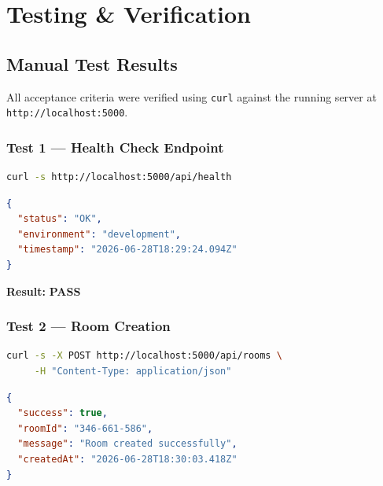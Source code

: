 \documentclass[11pt,a4paper]{article}
\begin{document}
\section{Testing \& Verification}

\subsection{Manual Test Results}

All acceptance criteria were verified using \texttt{curl} against the running server at \texttt{http://localhost:5000}.

\subsubsection{Test 1 --- Health Check Endpoint}

\begin{lstlisting}[language=bash, caption={Health Check curl Command}]
curl -s http://localhost:5000/api/health
\end{lstlisting}

\begin{lstlisting}[language=json, caption={Health Check --- Actual Output}]
{
  "status": "OK",
  "environment": "development",
  "timestamp": "2026-06-28T18:29:24.094Z"
}
\end{lstlisting}

\textbf{Result:} \textcolor{successgreen}{\textbf{PASS}} 

\vspace{0.8em}

\subsubsection{Test 2 --- Room Creation}

\begin{lstlisting}[language=bash, caption={Room Creation curl Command}]
curl -s -X POST http://localhost:5000/api/rooms \
     -H "Content-Type: application/json"
\end{lstlisting}

\begin{lstlisting}[language=json, caption={Room Creation --- Actual Output}]
{
  "success": true,
  "roomId": "346-661-586",
  "message": "Room created successfully",
  "createdAt": "2026-06-28T18:30:03.418Z"
}
\end{lstlisting}
\end{document}
